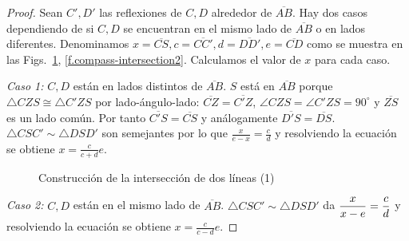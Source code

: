\begin{proof}
Sean $C',D'$ las reflexiones de $C,D$ alrededor de $\overline{AB}$.
Hay dos casos dependiendo de si $C,D$ se encuentran en el mismo lado de $\overline{AB}$ o en lados diferentes. Denominamos $x=\overline{CS}, c=\overline{CC'}, d=\overline{DD'}, e=\overline{CD}$ como se muestra en las Figs.~\ref{f.compass-intersection1}, \ref{f.compass-intersection2}. Calculamos el valor de $x$ para cada caso.

\textit{Caso 1:}
$C,D$ están en lados distintos de $\overline{AB}$.
$S$ está en $\overline{AB}$ porque $\triangle CZS\cong \triangle C'ZS$ por lado-ángulo-lado: $\overline{CZ}=\overline{C'Z}$, $\angle CZS=\angle C'ZS=90^\circ$ y $\overline{ZS}$ es un lado común. Por tanto $\overline{C'S}=\overline{CS}$ y análogamente $\overline{D'S}=\overline{DS}$. $\triangle CSC'\sim\triangle DSD'$ son semejantes por lo que $\displaystyle\frac{x}{e-x} = \displaystyle\frac{c}{d}$ y resolviendo la ecuación se obtiene $x=\displaystyle\frac{c}{c+d}e$.

\begin{figure}[ht]
\begin{center}
\end{center}
\caption{Construcción de la intersección de dos líneas (1)}\label{f.compass-intersection1}
\end{figure}

\textit{Caso 2:}
$C,D$ están en el mismo lado de $\overline{AB}$. $\triangle CSC'\sim\triangle DSD'$ da $\displaystyle\frac{x}{x-e}=\frac{c}{d}\displaystyle$ y resolviendo la ecuación se obtiene $x=\displaystyle\frac{c}{c-d}e$.


\end{proof}
